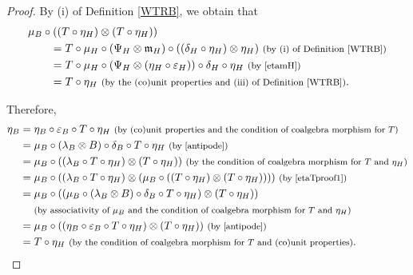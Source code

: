 \documentclass[pdftex]{sigma}
\numberwithin{equation}{section}
\begin{document}
\begin{proof}
By (i) of Definition \ref{WTRB}, we obtain that
\begin{align}
&\mu_{B}\circ((T\circ\eta_{H})\otimes (T\circ\eta_{H}))\nonumber\\
&\qquad{}=T\circ\mu_{H}\circ(\Psi_{H}\otimes\mathfrak{m}_{H})\circ((\delta_{H}\circ\eta_{H})\otimes \eta_{H})\ \text{\footnotesize\textnormal{(by (i) of Definition \ref{WTRB})}}\nonumber\\
&\qquad{}=T\circ\mu_{H}\circ(\Psi_{H}\otimes(\eta_{H}\circ\varepsilon_{H}))\circ\delta_{H}\circ\eta_{H}\ \text{\footnotesize\textnormal{(by \eqref{etamH})}}\nonumber\\
&\qquad{}=T\circ\eta_{H}\ \text{\footnotesize\textnormal{(by the (co)unit properties and (iii) of Definition \ref{WTRB})}}.\label{etaTproof1}
\end{align}

Therefore,
\begin{align*}
\eta_{B}&{}=\eta_{B}\circ\varepsilon_{B}\circ T\circ\eta_{H}\ \text{\footnotesize\textnormal{(by (co)unit properties and the condition of coalgebra morphism for $T$)}}\\
&{}=\mu_{B}\circ(\lambda_{B}\otimes B)\circ\delta_{B}\circ T\circ\eta_{H}\ \text{\footnotesize\textnormal{(by \eqref{antipode})}}\\
&{}=\mu_{B}\circ((\lambda_{B}\circ T\circ\eta_{H})\otimes (T\circ\eta_{H}))\ \text{\footnotesize\textnormal{(by the condition of coalgebra morphism for $T$ and $\eta_{H}$)}}\\
&{}=\mu_{B}\circ((\lambda_{B}\circ T\circ\eta_{H})\otimes(\mu_{B}\circ ((T\circ\eta_{H})\otimes(T\circ\eta_{H}))))\ \text{\footnotesize\textnormal{(by \eqref{etaTproof1})}}\\
&{}=\mu_{B}\circ((\mu_{B}\circ(\lambda_{B}\otimes B)\circ\delta_{B}\circ T\circ\eta_{H})\otimes(T\circ\eta_{H}))\\
&\quad{}\ \text{\footnotesize\textnormal{(by associativity of $\mu_{B}$ and the condition of coalgebra morphism for $T$ and $\eta_{H}$)}}\\
&{}=\mu_{B}\circ((\eta_{B}\circ\varepsilon_{B}\circ T\circ\eta_{H})\otimes(T\circ\eta_{H}))\ \text{\footnotesize\textnormal{(by \eqref{antipode})}}\\
&{}=T\circ\eta_{H}\ \text{\footnotesize\textnormal{(by the condition of coalgebra morphism for $T$ and (co)unit properties)}}.\tag*{\qed}
\end{align*}
\renewcommand{\qed}{}
\end{proof}
\end{document}
